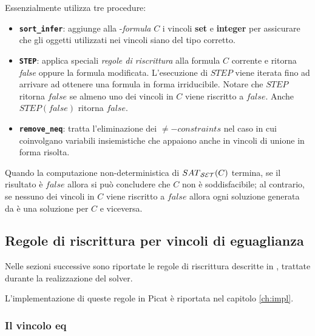 \documentclass[12pt,a4paper,openright]{book} %
\begin{document}
Essenzialmente  utilizza tre procedure:

\begin{itemize}
	\item \textbf{\texttt{sort\_infer}}: aggiunge alla
          \calset{}-\textit{formula} $C$ i vincoli \textbf{set} e
          \textbf{integer} per assicurare che gli oggetti utilizzati
          nei vincoli siano del tipo corretto.

	\item \textbf{\texttt{STEP}}: applica speciali \textit{regole
          di riscrittura} alla formula $C$ corrente e ritorna
          \textit{false} oppure la formula modificata. L'esecuzione di
          $STEP$ viene iterata fino ad arrivare ad ottenere una
          formula in forma irriducibile. Notare che $STEP$ ritorna
          $false$ se almeno uno dei vincoli in $C$ viene riscritto a
          $false$. Anche $STEP(false)$ ritorna $false$.

	\item \textbf{\texttt{remove\_neq}}: tratta l'eliminazione dei
          $\neq-constraints$ nel caso in cui coinvolgano variabili
          insiemistiche che appaiono anche in vincoli di unione in
          forma risolta.
\end{itemize}

Quando la computazione non-deterministica di $SAT\textsubscript{\ensuremath{\mathcal{S}}\ensuremath{\mathcal{E}}\ensuremath{\mathcal{T}}}{}(C)$ termina,
se il risultato è $false$ allora si può concludere che $C$ non è
soddisfacibile; al contrario, se nessuno dei vincoli in $C$ viene
riscritto a $false$ allora ogni soluzione generata da \satset{} è una
soluzione per $C$ e viceversa.

\subsection{Regole di riscrittura per vincoli di eguaglianza}
\label{subsec:clpbasedlang_lset_rewriteeq}


Nelle sezioni successive sono riportate le regole di riscrittura
descritte in \cite{Rossi18}, trattate durante la realizzazione del
solver.

L'implementazione di queste regole in Picat è riportata nel capitolo
\ref{ch:impl}.

\subsubsection{Il vincolo eq}
\end{document}
